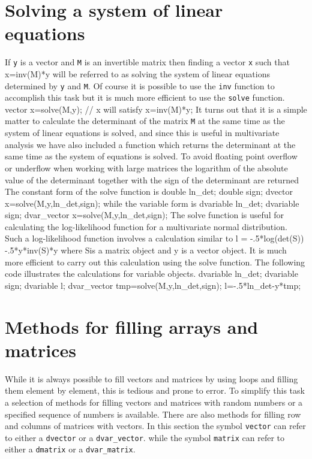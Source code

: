 \documentclass[12pt]{book}
\begin{document}
\section{Solving a system of linear equations}
If {\tt y} is a vector and {\tt M} is an invertible matrix then finding
a vector {\tt x} such that
\beginexample
x=inv(M)*y
\endexample
\noindent will be referred to as solving the system of linear equations
determined by {\tt y} and {\tt M}. Of course it is possible
to use the {\tt inv} function to accomplish this task but it is much
more efficient to use the {\tt solve} function.
\beginexample
vector x=solve(M,y); // x will satisfy x=inv(M)*y;
\endexample
It turns out that it is a simple matter to calculate the determinant
of the matrix {\tt M} at the same time as the system of linear
equations is solved, and since this is useful in multivariate
analysis we have also included a function which returns the 
determinant at the same time as the system of equations is solved.
To avoid floating point overflow or underflow when working with
large matrices the logarithm of the absolute value of the
determinant together with the sign of the determinant are returned 
The constant form of the solve function is
\beginexample
double ln_det;
double sign;
dvector x=solve(M,y,ln_det,sign);
\endexample
\noindent while the variable form is
\beginexample
dvariable ln_det;
dvariable sign;
dvar_vector x=solve(M,y,ln_det,sign);
\endexample
The solve function is useful for calculating the log-likelihood
function for a multivariate normal distribution.
Such a log-likelihood function involves a calculation similar to
\beginexample
  l = -.5*log(det(S)) -.5*y*inv(S)*y
\endexample
\noindent where Sis a matrix object and y is a vector object.
It is much more efficient to carry out this calculation using
the solve function. The following code illustrates the
calculations for variable objects. 
\beginexample
   dvariable ln_det;
   dvariable sign;
   dvariable l;
   dvar_vector tmp=solve(M,y,ln_det,sign);
   l=-.5*ln_det-y*tmp;
\endexample

\section{Methods for filling arrays and matrices}
While it is always possible to fill vectors and matrices by
using loops and filling them element by element, this is tedious
and prone to error. To simplify this task a selection 
of methods for filling vectors and
matrices with random numbers or a specified sequence of numbers is available.
There are also methods for filling row and columns of matrices with
vectors. In this section the symbol {\tt vector} can refer to either
a {\tt dvector} or a {\tt dvar\_vector}.
while the symbol {\tt matrix} can refer to either
a {\tt dmatrix} or a {\tt dvar\_matrix}.
\end{document}
